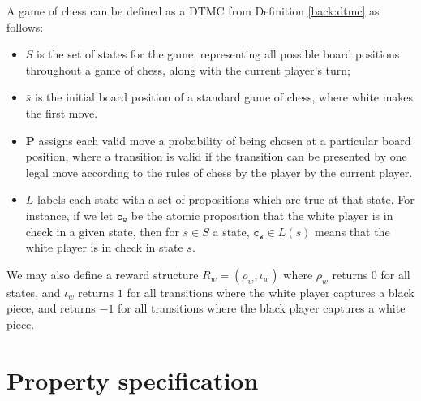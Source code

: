 \begin{example}
\label{back:chess}
    A game of chess can be defined as a DTMC from Definition \ref{back:dtmc} as follows:

    \begin{itemize}
        \item $S$ is the set of states for the game, representing all possible board positions throughout a game of chess, along with the current player's turn; %
        \item $\bar{s}$ is the initial board position of a standard game of chess, where white makes the first move.
        \item $\mathbf{P}$ assigns each valid move a probability of being chosen at a particular board position, where a transition is valid if the transition can be presented by one legal move according to the rules of chess by the player by the current player.
        \item $L$ labels each state with a set of propositions which are true at that state. For instance, if we let $\mathtt{c_w}$ be the atomic proposition that the white player is in check in a given state, then for $s \in S$ a state, $\mathtt{c_w} \in L(s)$ means that the white player is in check in state $s$.
    \end{itemize}
    
    We may also define a reward structure $R_w = (\rho_w, \iota_w)$ where $\rho_w$ returns $0$ for all states, and $\iota_w$ returns $1$ for all transitions where the white player captures a black piece, and returns $-1$ for all transitions where the black player captures a white piece.
\end{example}

\section{Property specification}
\label{back:prop_spec}

